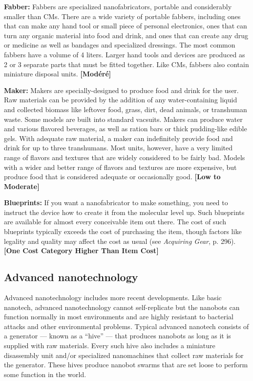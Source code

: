 {{\textbf{Fabber:} Fabbers are specialized nanofabricators, portable and considerably smaller than CMs. There are a wide variety of portable fabbers, including ones that can make any hand tool or small piece of personal electronics, ones that can turn any organic material into food and drink, and ones that can create any drug or medicine as well as bandages and specialized dressings. The most common fabbers have a volume of 4 liters. Larger hand tools and devices are produced as 2 or 3 separate parts that must be fitted together. Like CMs, fabbers also contain miniature disposal units. \textbf{[Modéré]} 

\textbf{Maker:} Makers are specially-designed to produce food and drink for the user. Raw materials can be provided by the addition of any water-containing liquid and collected biomass like leftover food, grass, dirt, dead animals, or transhuman waste. Some models are built into standard vacsuits. Makers can produce water and various flavored beverages, as well as ration bars or thick pudding-like edible gels. With adequate raw material, a maker can indefinitely provide food and drink for up to three transhumans. Most units, however, have a very limited range of flavors and textures that are widely considered to be fairly bad. Models with a wider and better range of flavors and textures are more expensive, but produce food that is considered adequate or occasionally good. \textbf{[Low to Moderate]} 

\textbf{Blueprints:} If you want a nanofabricator to make something, you need to instruct the device how to create it from the molecular level up. Such blueprints are available for almost every conceivable item out there. The cost of such blueprints typically exceeds the cost of purchasing the item, though factors like legality and quality may affect the cost as usual (see \emph{Acquiring Gear}, p. 296). \textbf{[One Cost Category Higher Than Item Cost]} 



\subsection{Advanced nanotechnology} \label{sec:advanced-nanotech} 

Advanced nanotechnology includes more recent developments. Like basic nanotech, advanced nanotechnology cannot self-replicate but the nanobots can function normally in most environments and are highly resistant to bacterial attacks and other environmental problems. Typical advanced nanotech consists of a generator --- known as a ``hive'' --- that produces nanobots as long as it is supplied with raw materials. Every such hive also includes a miniature disassembly unit and/or specialized nanomachines that collect raw materials for the generator. These hives produce nanobot swarms that are set loose to perform some function in the world. 

}}
